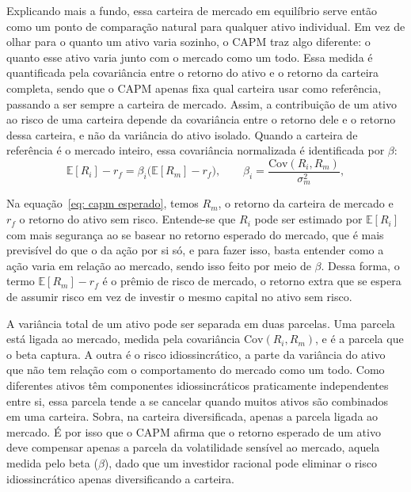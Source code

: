 \documentclass[12pt,a4paper]{article}
\begin{document}
Explicando mais a fundo, essa carteira de mercado em equilíbrio serve então como um ponto de comparação natural para qualquer ativo individual. Em vez de olhar para o quanto um ativo varia sozinho, o CAPM traz algo diferente: o quanto esse ativo varia junto com o mercado como um todo. Essa medida é quantificada pela covariância entre o retorno do ativo e o retorno da carteira completa, sendo que o CAPM apenas fixa qual carteira usar como referência, passando a ser sempre a carteira de mercado. Assim, a contribuição de um ativo ao risco de uma carteira depende da covariância entre o retorno dele e o retorno dessa carteira, e não da variância do ativo isolado. Quando a carteira de referência é o mercado inteiro, essa covariância normalizada é identificada por $\beta$:
\begin{equation}
\label{eq: capm esperado}
\mathbb{E}[R_i] - r_f = \beta_i \big(\mathbb{E}[R_m] - r_f\big),
\qquad
\beta_i = \frac{\mathrm{Cov}(R_i, R_m)}{\sigma_m^2},
\end{equation}

Na equação~\eqref{eq: capm esperado}, temos $R_m$, o retorno da carteira de mercado e $r_f$ o retorno do ativo sem risco. Entende-se que $R_i$ pode ser estimado por $\mathbb{E}[R_i]$ com mais segurança ao se basear no retorno esperado do mercado, que é mais previsível do que o da ação por si só, e para fazer isso, basta entender como a ação varia em relação ao mercado, sendo isso feito por meio de $\beta$. Dessa forma, o termo $\mathbb{E}[R_m] - r_f$ é o prêmio de risco de mercado, o retorno extra que se espera de assumir risco em vez de investir o mesmo capital no ativo sem risco.

A variância total de um ativo pode ser separada em duas parcelas. Uma parcela está ligada ao mercado, medida pela covariância $\mathrm{Cov}(R_i, R_m)$, e é a parcela que o beta captura. A outra é o risco idiossincrático, a parte da variância do ativo que não tem relação com o comportamento do mercado como um todo. Como diferentes ativos têm componentes idiossincráticos praticamente independentes entre si, essa parcela tende a se cancelar quando muitos ativos são combinados em uma carteira. Sobra, na carteira diversificada, apenas a parcela ligada ao mercado. É por isso que o CAPM afirma que o retorno esperado de um ativo deve compensar apenas a parcela da volatilidade sensível ao mercado, aquela medida pelo beta ($\beta$), dado que um investidor racional pode eliminar o risco idiossincrático apenas diversificando a carteira.
\end{document}
